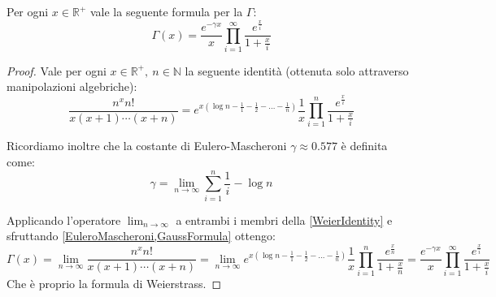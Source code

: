 \begin{corollary}\label{WeierstrassFormula}
	Per ogni $x\in\mathbb{R^+}$ vale la seguente formula per la $\Gamma$:
\begin{equation*}
	\Gamma(x)=\frac{e^{-\gamma x}}x\prod_{i=1}^{\infty} \frac{e^{\frac xi}}{1+\frac xi}
\end{equation*}
\end{corollary}
\begin{proof}
	Vale per ogni $x\in\mathbb{R^+},\ n\in\mathbb{N}$ la seguente identità (ottenuta solo attraverso manipolazioni algebriche):
	\begin{equation}\label{WeierIdentity}
		\frac{n^xn!}{x(x+1)\cdots (x+n)}=e^{x\left(\log{n}-\frac11-\frac12-\dots-\frac1n\right)}\frac1x\prod_{i=1}^n\frac{e^{\frac xi}}{1+\frac xi}
	\end{equation}
	
	Ricordiamo inoltre che la costante di Eulero-Mascheroni $\gamma\approx0.577$ è definita come:
	\begin{equation}\label{EuleroMascheroni}
		\gamma=\lim_{n\to\infty} \sum_{i=1}^n \frac1i -\log{n}
	\end{equation}
	
	Applicando l'operatore $\lim_{n\to\infty}$ a entrambi i membri della \cref{WeierIdentity} e sfruttando \cref{EuleroMascheroni,GaussFormula} ottengo:
	\begin{equation*}
		\Gamma(x)=\lim_{n\to \infty} \frac{n^xn!}{x(x+1)\cdots(x+n)}
		=\lim_{n\to\infty} e^{x\left(\log{n}-\frac11-\frac12-\dots-\frac1n\right)}\frac1x\prod_{i=1}^n\frac{e^{\frac xn}}{1+\frac xn}
		=\frac{e^{-\gamma x}}x\prod_{i=1}^{\infty} \frac{e^{\frac xi}}{1+\frac xi}
	\end{equation*}
	Che è proprio la formula di Weierstrass.
\end{proof}






